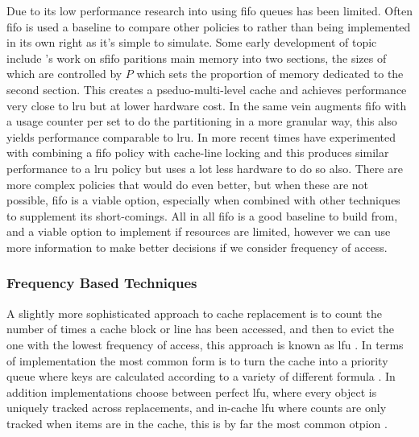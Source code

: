 Due to its low performance research into using \gls{fifo} queues has been limited. Often \gls{fifo} is used a baseline to compare other policies to \cite{faresPerformanceEvaluationTraditional2012} rather than being implemented in its own right as it's simple to simulate. Some early development of topic include \citet{turnerSegmentedFIFOPage1981}'s work on \gls{sfifo} paritions main memory into two sections, the sizes of which are controlled by $P$ which sets the proportion of memory dedicated to the second section. This creates a pseduo-multi-level cache and achieves performance very close to \gls{lru} but at lower hardware cost. In the same vein \citet{devilleLowcostUsagebasedReplacement1990} augments \gls{fifo} with a usage counter per set to do the partitioning in a more granular way, this also yields performance comparable to \gls{lru}. In more recent times \citet{wei-chetsengPRRLowoverheadCache2012} have experimented with combining a \gls{fifo} policy with cache-line locking and this produces similar performance to a \gls{lru} policy but uses a lot less hardware to do so also. There are more complex policies that would do even better, but when these are not possible, \gls{fifo} is a viable option, especially when combined with other techniques to supplement its short-comings. All in all \gls{fifo} is a good baseline to build from, and a viable option to implement if resources are limited, however we can use more information to make better decisions if we consider frequency of access. 

\subsubsection{Frequency Based Techniques}

A slightly more sophisticated approach to cache replacement is to count the number of times a cache block or line has been accessed, and then to evict the one with the lowest frequency of access, this approach is known as \gls{lfu} . In terms of implementation the most common form is to turn the cache into a priority queue where keys are calculated according to a variety of different formula \cite{podlipnigSurveyWebCache2003}. In addition implementations choose between perfect \gls{lfu}, where every object is uniquely tracked across replacements, and in-cache \gls{lfu} where counts are only tracked when items are in the cache, this is by far the most common otpion \cite{podlipnigSurveyWebCache2003}.

